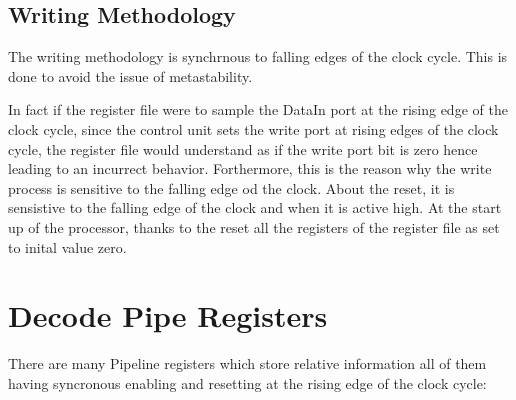         \subsection{Writing Methodology}
        The writing methodology is synchrnous to falling edges of the clock cycle. This is done to avoid the issue of metastability.

        In fact if the register file were to sample the DataIn port at the rising edge of the clock cycle, since the control unit sets the write port
        at rising edges of the clock cycle, the register file would understand as if the write port bit is zero hence leading to an incurrect behavior. Forthermore, 
        this is the reason why the write process is sensitive to the falling edge od the clock.
        About the reset, it is sensistive to the falling edge of the clock and when it is active high. At the start up of the processor, thanks to the reset all the
        registers of the register file as set to inital value zero.

\section {Decode Pipe Registers}

    There are many Pipeline registers which store relative information all of them having syncronous enabling and resetting at the rising edge of the clock cycle:

